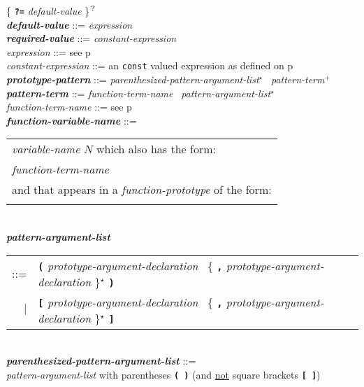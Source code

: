 \documentclass[12pt]{article}
\newcommand{\TT}[1]{{\tt \bfseries #1}}
\newcommand{\STAR}{{\Large $^\star$}}
\newcommand{\PLUS}[1][]{{$^{+#1}$}}
\newcommand{\QMARK}{{$^{\,\mbox{\footnotesize ?}}$}}
\newcommand{\emkey}[1]{{\em \bfseries #1}}
\newcommand{\pagref}[1]{p\pageref{#1}}
\newenvironment{indpar}[1][0.3in]%
	{\begin{list}{}%
		     {\setlength{\itemsep}{0in}%
		      \setlength{\topsep}{0in}%
		      \setlength{\parsep}{1ex}%
		      \setlength{\labelwidth}{#1}%
		      \setlength{\leftmargin}{#1}%
		      \addtolength{\leftmargin}{\labelsep}}%
	 \item}%
	{\end{list}}
\begin{document}
\begin{indpar}[0.1in]
\hspace*{0.5in}{\em prototype-result-variable-declaration}
          \{ \TT{?=} {\em default-value} \}\QMARK{}
\\[0.5ex]
\emkey{default-value} ::= {\em expression}
\\[0.5ex]
\emkey{required-value} ::= {\em constant-expression}
\\[0.5ex]
{\em expression} ::= see \pagref{EXPRESSION}
\\[0.5ex]
{\em constant-expression} ::= an {\tt const} valued expression as
    defined on \pagref{CONSTANT-EXPRESSION}
\\[0.5ex]
\emkey{prototype-pattern}\label{PROTOTYPE-PATTERN}
    ::= {\em parenthesized-pattern-argument-list}\STAR{}~
        {\em pattern-term}\PLUS{}
\\[0.5ex]
\emkey{pattern-term}\label{PATTERN-TERM}
    ::= {\em function-term-name}~ {\em pattern-argument-list}\STAR{}
\\[0.5ex]
{\em function-term-name} ::= see \pagref{FUNCTION-TERM-NAME}
\\[0.5ex]
\emkey{function-variable-name}\label{FUNCTION-VARIABLE-NAME} ::= \\
\hspace*{0.5in}
    \begin{tabular}[t]{@{}p{5in}@{}}
    {\em variable-name} $N$ which also has the form: \\
    \hspace*{1in}{\em module-abbreviation}\QMARK{} {\em function-term-name} \\
    and that appears in a {\em function-prototype} of the form: \\
    \hspace*{1in}{\tt function $N$ = \ldots}
    \end{tabular}
\\[0.5ex]
\emkey{pattern-argument-list}\label{PATTERN-ARGUMENT-LIST} \\
\hspace*{0.5in}
    \begin{tabular}[t]{@{}rl}
    ::= & \TT{(} {\em prototype-argument-declaration}~
	     \{ \TT{,} {\em prototype-argument-declaration} \}\STAR{} \TT{)} \\
    $|$ & \TT{[} {\em prototype-argument-declaration}~
	     \{ \TT{,} {\em prototype-argument-declaration} \}\STAR{} \TT{]} \\
    \end{tabular}
\\[0.5ex]
\emkey{parenthesized-pattern-argument-list}%
    \label{PARENTHESIZED-PATTERN-ARGUMENT-LIST} ::= \\
\hspace*{0.5in}
    {\em pattern-argument-list} with parentheses \TT{(~)}
    (and \underline{not} square brackets \TT{[~]})
\end{indpar}
\end{document}
